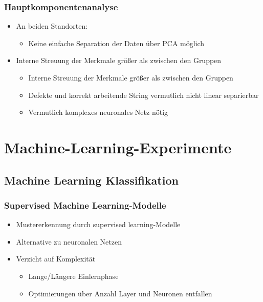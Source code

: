 \documentclass[utf8x, xcolor=dvipsnames]{beamer}
\begin{document}
\begin{frame}
\frametitle{Hauptkomponentenanalyse}
\begin{itemize}
	\item An beiden Standorten:
	\begin{itemize}
		\item Keine einfache Separation der Daten über PCA möglich
	\end{itemize}
	
	\item Interne Streuung der Merkmale größer als zwischen den Gruppen
	\begin{itemize}
		\item Interne Streuung der Merkmale größer als zwischen den Gruppen
		\item Defekte und korrekt arbeitende String vermutlich nicht linear separierbar
		\item Vermutlich komplexes neuronales Netz nötig
	\end{itemize}
\end{itemize}
\end{frame}

\section[ML-Experimente]{Machine-Learning-Experimente}

\subsection{Machine Learning Klassifikation}
\begin{frame}
\frametitle{Supervised Machine Learning-Modelle}
\begin{itemize}
	\item Mustererkennung durch supervised learning-Modelle\newline
	\item Alternative zu neuronalen Netzen
	\item Verzicht auf Komplexität
		\begin{itemize}
		\item Lange/Längere Einlernphase
		\item Optimierungen über Anzahl Layer und Neuronen entfallen
	\end{itemize}
\end{itemize}
\end{frame}
\end{document}
